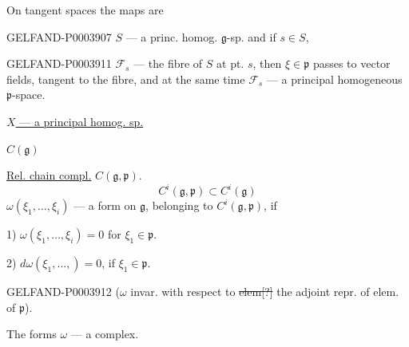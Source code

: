 On tangent spaces the maps are 

\begin{GelfandAdjacentEvidence}{GELFAND-P000390}{7}
$S$ --- a princ. homog. $\mathfrak{g}$-sp. and if $s\in S$,
\end{GelfandAdjacentEvidence}



\begin{GelfandAdjacentEvidence}{GELFAND-P000391}{1}
$\mathcal{F}_s$ --- the fibre of $S$ at pt. $s$, then $\xi\in\mathfrak{p}$ passes to vector fields,
tangent to the fibre, and at the same time $\mathcal{F}_s$ --- a principal homogeneous
$\mathfrak{p}$-space.
\end{GelfandAdjacentEvidence}


\underline{$X$ --- a principal homog. sp.}

 $C (\mathfrak{g})$

\underline{Rel. chain compl.} $C (\mathfrak{g},\mathfrak{p})$.
\begin{equation*}
C^i (\mathfrak{g},\mathfrak{p})\subset C^i (\mathfrak{g})
\end{equation*}
$\omega (\xi_1,\dots,\xi_i)$ --- a form on $\mathfrak{g}$, belonging to
$C^i (\mathfrak{g},\mathfrak{p})$, if

1) $\omega (\xi_1,\dots,\xi_i)=0$ for $\xi_1\in\mathfrak{p}$.

2) $d\omega (\xi_1,\dots,)=0$, if $\xi_1\in\mathfrak{p}$.

\begin{GelfandAdjacentEvidence}{GELFAND-P000391}{2}
($\omega$ invar. with respect to \sout{elem[?]} the adjoint repr. of elem. of $\mathfrak{p}$).
\end{GelfandAdjacentEvidence}


The forms $\omega$ --- a complex.

